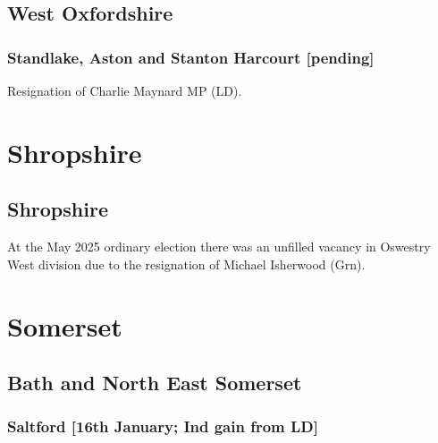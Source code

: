 \documentclass[a4paper,openany]{book}
\begin{document}
\begin{resultsiii}
\subsection*{West Oxfordshire}

\subsubsection*{Standlake, Aston and Stanton Harcourt \hspace*{\fill}\nolinebreak[1]%
	\enspace\hspace*{\fill}
	[pending]}


Resignation of Charlie Maynard MP (LD).

\section{Shropshire}

\subsection*{Shropshire}

At the May 2025 ordinary election there was an unfilled vacancy in Oswestry West division due to the resignation of Michael Isherwood (Grn).%

\section{Somerset}

\subsection*{Bath and North East Somerset}

\subsubsection*{Saltford \hspace*{\fill}\nolinebreak[1]%
	\enspace\hspace*{\fill}
	[16th January; Ind gain from LD]}



\end{resultsiii}
\end{document}
